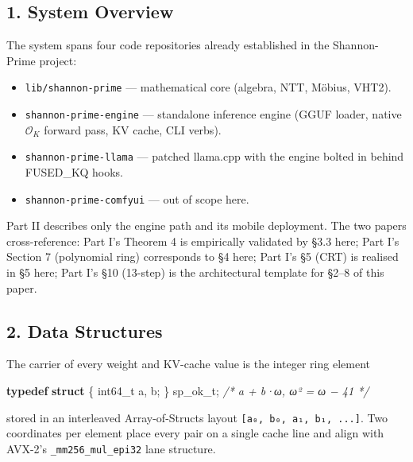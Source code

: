 \documentclass[
  11pt,
]{article}
\newenvironment{Shaded}{}{}
\newcommand{\CommentTok}[1]{\textcolor[rgb]{0.38,0.63,0.69}{\textit{#1}}}
\newcommand{\DataTypeTok}[1]{\textcolor[rgb]{0.56,0.13,0.00}{#1}}
\newcommand{\KeywordTok}[1]{\textcolor[rgb]{0.00,0.44,0.13}{\textbf{#1}}}
\newcommand{\NormalTok}[1]{#1}
\providecommand{\tightlist}{%
  \setlength{\itemsep}{0pt}\setlength{\parskip}{0pt}}
\begin{document}
\hypertarget{system-overview}{%
\subsection{1. System Overview}\label{system-overview}}

The system spans four code repositories already established in the
Shannon-Prime project:

\begin{itemize}
\tightlist
\item
  \texttt{lib/shannon-prime} --- mathematical core (algebra, NTT,
  Möbius, VHT2).
\item
  \texttt{shannon-prime-engine} --- standalone inference engine (GGUF
  loader, native \(\mathcal{O}_K\) forward pass, KV cache, CLI verbs).
\item
  \texttt{shannon-prime-llama} --- patched llama.cpp with the engine
  bolted in behind FUSED\_KQ hooks.
\item
  \texttt{shannon-prime-comfyui} --- out of scope here.
\end{itemize}

Part II describes only the engine path and its mobile deployment. The
two papers cross-reference: Part I's Theorem 4 is empirically validated
by §3.3 here; Part I's Section 7 (polynomial ring) corresponds to §4
here; Part I's §5 (CRT) is realised in §5 here; Part I's §10 (13-step)
is the architectural template for §2--8 of this paper.

\hypertarget{data-structures}{%
\subsection{2. Data Structures}\label{data-structures}}

The carrier of every weight and KV-cache value is the integer ring
element

\begin{Shaded}
\begin{Highlighting}[]
\KeywordTok{typedef} \KeywordTok{struct}\NormalTok{ \{ }\DataTypeTok{int64\_t}\NormalTok{ a, b; \} sp\_ok\_t;   }\CommentTok{/* a + b·ω, ω² = ω − 41 */}
\end{Highlighting}
\end{Shaded}

stored in an interleaved Array-of-Structs layout
\texttt{{[}a₀,\ b₀,\ a₁,\ b₁,\ ...{]}}. Two coordinates per element
place every pair on a single cache line and align with AVX-2's
\texttt{\_mm256\_mul\_epi32} lane structure.
\end{document}
